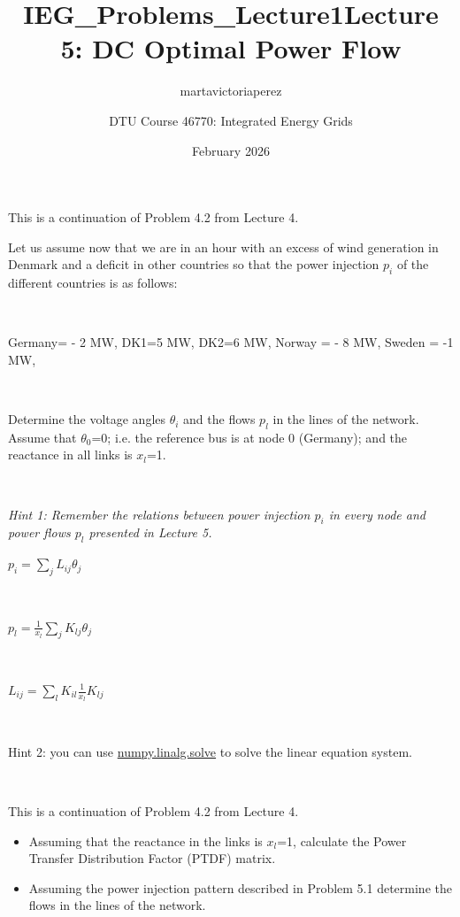 \documentclass[10pt]{article}
\title{IEG_Problems_Lecture1}
\author{martavictoriaperez }
\date{February 2026}
\newenvironment{problem}[2][Problem]{\begin{trivlist}
\item[\hskip \labelsep {\bfseries #1}\hskip \labelsep {\bfseries #2.}]}{\end{trivlist}}
\begin{document}
 
\title{\textbf{Lecture 5: DC Optimal Power Flow}}
\author{
DTU Course 46770: Integrated Energy Grids }
\maketitle
\begin{problem}{5.1}

This is a continuation of Problem 4.2 from Lecture 4.

Let us assume now that we are in an hour with an excess of wind generation in Denmark and a deficit in other countries so that the power injection $p_i$ of the different countries is as follows:

\

Germany= - 2 MW, DK1=5 MW, DK2=6 MW, Norway = - 8 MW, Sweden = -1 MW, 

\

Determine the voltage angles $\theta_i$  and the flows $p_l$ in the lines of the network. Assume that $\theta_0$=0; i.e. the reference bus is at node 0 (Germany); and the reactance in all links is $x_l$=1.

\

\textit{Hint 1: Remember the relations between power injection $p_i$ in every node and power flows $p_l$ presented in Lecture 5.}

$p_i=\sum_j {L_{ij} \theta_j } $

\

$p_l=\frac{1}{x_l}  \sum_j{K_{lj} \theta_j}$       

\

$L_{ij}=\sum_l{K_{il} \frac{1}{x_l} K_{lj}}$

\

Hint 2: you can use \href{https://numpy.org/doc/2.1/reference/generated/numpy.linalg.solve.html}{numpy.linalg.solve} to solve the linear equation system. 



\end{problem}

\

\begin{problem}{5.2}

This is a continuation of Problem 4.2 from Lecture 4.

\begin{itemize}

\item[a)] Assuming that the reactance in the links is $x_l$=1, calculate the Power Transfer Distribution Factor (PTDF) matrix.

\item[b)] Assuming the power injection pattern described in Problem 5.1 determine the flows in the lines of the network. 

\end{itemize}

\end{problem}
\end{document}
